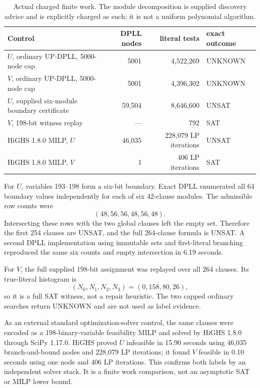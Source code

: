 \documentclass[11pt]{article}
\begin{document}
\begin{table}[h]
\centering
\begin{tabular}{lrrl}
\toprule
Control & DPLL nodes & literal tests & exact outcome \\
\midrule
$U$, ordinary UP-DPLL, 5000-node cap & 5001 & 4,522,269 & UNKNOWN \\
$V$, ordinary UP-DPLL, 5000-node cap & 5001 & 4,396,302 & UNKNOWN \\
$U$, supplied six-module boundary certificate & 59,504 & 8,646,600 & UNSAT \\
$V$, 198-bit witness replay & --- & 792 & SAT \\
HiGHS 1.8.0 MILP, $U$ & 46,035 & 228,079 LP iterations & UNSAT \\
HiGHS 1.8.0 MILP, $V$ & 1 & 406 LP iterations & SAT \\
\bottomrule
\end{tabular}
\caption{Actual charged finite work.  The module decomposition is supplied discovery
advice and is explicitly charged as such; it is not a uniform polynomial algorithm.}
\end{table}

For $U$, variables 193--198 form a six-bit boundary.  Exact DPLL enumerated all 64
boundary values independently for each of six 42-clause modules.  The admissible row
counts were
\[
(48,56,56,48,56,48).
\]
Intersecting these rows with the two global clauses left the empty set.  Therefore the
first 254 clauses are UNSAT, and the full 264-clause formula is UNSAT.  A second DPLL
implementation using immutable sets and first-literal branching reproduced the same
six counts and empty intersection in 6.19 seconds.

For $V$, the full supplied 198-bit assignment was replayed over all 264 clauses.  Its
true-literal histogram is
\[
(N_0,N_1,N_2,N_3)=(0,158,80,26),
\]
so it is a full SAT witness, not a repair heuristic.  The two capped ordinary searches
return UNKNOWN and are not used as label evidence.

As an external standard optimization-solver control, the same clauses were encoded as
a 198-binary-variable feasibility MILP and solved by HiGHS 1.8.0 through SciPy 1.17.0.
HiGHS proved $U$ infeasible in 15.90 seconds using 46,035 branch-and-bound nodes and
228,079 LP iterations; it found $V$ feasible in 0.10 seconds using one node and 406 LP
iterations.  This confirms both labels by an independent solver stack.  It is a finite
work comparison, not an asymptotic SAT or MILP lower bound.
\end{document}

